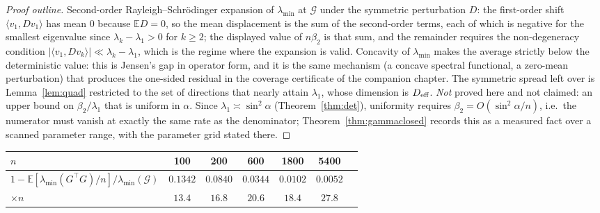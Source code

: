 \documentclass[11pt]{article}
\theoremstyle{remark}
\newcommand{\Gr}{\mathcal{G}}
\begin{document}
\begin{proof}[Proof outline]
Second-order Rayleigh--Schr\"odinger expansion of $\lambda_{\min}$ at $\Gr$ under the
symmetric perturbation $D$: the first-order shift $\langle v_1,Dv_1\rangle$ has mean
$0$ because $\mathbb{E}D=0$, so the mean displacement is the sum of the second-order
terms, each of which is negative for the smallest eigenvalue since $\lambda_k-\lambda_1>0$
for $k\ge2$; the displayed value of $n\beta_2$ is that sum, and the remainder requires the
non-degeneracy condition $|\langle v_1,Dv_k\rangle|\ll\lambda_k-\lambda_1$, which is the
regime where the expansion is valid. Concavity of $\lambda_{\min}$ makes the average
strictly below the deterministic value: this is Jensen's gap in operator form, and it is
the same mechanism (a concave spectral functional, a zero-mean perturbation) that produces
the one-sided residual in the coverage certificate of the companion chapter. The symmetric
spread left over is Lemma~\ref{lem:quad} restricted to the set of directions that nearly
attain $\lambda_1$, whose dimension is $D_{\rm eff}$.
\emph{Not} proved here and not claimed: an upper bound on $\beta_2/\lambda_1$ that is
uniform in $\alpha$. Since $\lambda_1\asymp\sin^2\alpha$ (Theorem~\ref{thm:det}),
uniformity requires $\beta_2=O(\sin^2\alpha/n)$, i.e.\ the numerator must vanish at
exactly the same rate as the denominator; Theorem~\ref{thm:gammaclosed} records this as a
measured fact over a scanned parameter range, with the parameter grid stated there.
\end{proof}

\begin{center}\begin{tabular}{lcccccc}
\toprule $n$ & 100 & 200 & 600 & 1800 & 5400\\
\midrule
$1-\mathbb{E}[\lambda_{\min}(G^{\top}G)/n]/\lambda_{\min}(\Gr)$
 & $0.1342$ & $0.0840$ & $0.0344$ & $0.0102$ & $0.0052$\\
$\times n$ & $13.4$ & $16.8$ & $20.6$ & $18.4$ & $27.8$\\
\bottomrule
\end{tabular}\end{center}
\end{document}

